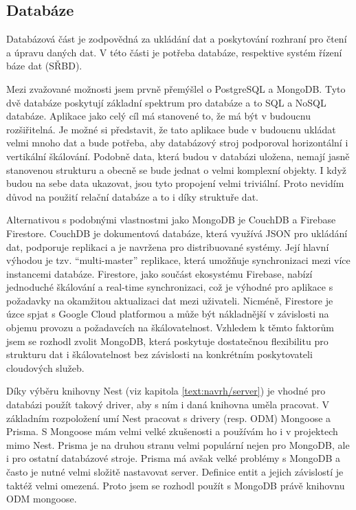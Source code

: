 \subsection{Databáze}\label{text:navrh/databaze}

Databázová část je zodpovědná za ukládání dat a poskytování rozhraní pro čtení a úpravu daných dat. 
V této části je potřeba databáze, respektive systém řízení báze dat (SŘBD).

Mezi zvažované možnosti jsem prvně přemýšlel o PostgreSQL a MongoDB.
Tyto dvě databáze poskytují základní spektrum pro databáze a to SQL a NoSQL databáze. 
Aplikace jako celý cíl má stanovené to, že má být v budoucnu rozšiřitelná.
Je možné si představit, že tato aplikace bude v budoucnu ukládat velmi mnoho dat a bude potřeba, aby databázový stroj podporoval horizontální i vertikální škálování.
Podobně data, která budou v databázi uložena, nemají jasně stanovenou strukturu a obecně se bude jednat o velmi komplexní objekty.
I když budou na sebe data ukazovat, jsou tyto propojení velmi triviální.
Proto nevidím důvod na použití relační databáze a to i díky struktuře dat.

Alternativou s podobnými vlastnostmi jako MongoDB je CouchDB a Firebase Firestore. 
CouchDB je dokumentová databáze, která využívá JSON pro ukládání dat, podporuje replikaci a je navržena pro distribuované systémy. 
Její hlavní výhodou je tzv. \enquote{multi-master} replikace, která umožňuje synchronizaci mezi více instancemi databáze. 
Firestore, jako součást ekosystému Firebase, nabízí jednoduché škálování a real-time synchronizaci, což je výhodné pro aplikace s požadavky na okamžitou aktualizaci dat mezi uživateli. 
Nicméně, Firestore je úzce spjat s Google Cloud platformou a může být nákladnější v závislosti na objemu provozu a požadavcích na škálovatelnost. 
Vzhledem k těmto faktorům jsem se rozhodl zvolit MongoDB, která poskytuje dostatečnou flexibilitu pro strukturu dat i škálovatelnost bez závislosti na konkrétním poskytovateli cloudových služeb.

Díky výběru knihovny Nest (viz kapitola \ref{text:navrh/server}) je vhodné pro databázi použít takový driver, aby s ním i daná knihovna uměla pracovat.
V základním rozpoložení umí Nest pracovat s drivery (resp. ODM) Mongoose a Prisma.
S Mongoose mám velmi velké zkušenosti a používám ho i v projektech mimo Nest.
Prisma je na druhou stranu velmi populární nejen pro MongoDB, ale i pro ostatní databázové stroje.
Prisma má avšak velké problémy s MongoDB a často je nutné velmi složitě nastavovat server.
Definice entit a jejich závislostí je taktéž velmi omezená.
Proto jsem se rozhodl použít s MongoDB právě knihovnu ODM mongoose.


